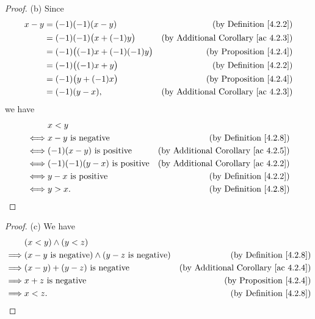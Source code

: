 \begin{proof}{(b)}
    Since
    \begin{align*}
        x - y & = (-1)(-1)(x - y)                 & \text{(by Definition \ref{4.2.2})}              \\
              & = (-1)(-1)\big(x + (-1)y\big)     & \text{(by Additional Corollary \ref{ac 4.2.3})} \\
              & = (-1)\big((-1)x + (-1)(-1)y\big) & \text{(by Proposition \ref{4.2.4})}             \\
              & = (-1)\big((-1)x + y\big)         & \text{(by Definition \ref{4.2.2})}              \\
              & = (-1)\big(y + (-1)x\big)         & \text{(by Proposition \ref{4.2.4})}             \\
              & = (-1)(y - x),                    & \text{(by Additional Corollary \ref{ac 4.2.3})}
    \end{align*}
    we have
    \begin{align*}
             & x < y                                                                                 \\
        \iff & x - y \text{ is negative}           & \text{(by Definition \ref{4.2.8})}              \\
        \iff & (-1)(x - y) \text{ is positive}     & \text{(by Additional Corollary \ref{ac 4.2.5})} \\
        \iff & (-1)(-1)(y - x) \text{ is positive} & \text{(by Additional Corollary \ref{ac 4.2.2})} \\
        \iff & y - x \text{ is positive}           & \text{(by Definition \ref{4.2.2})}              \\
        \iff & y > x.                              & \text{(by Definition \ref{4.2.8})}
    \end{align*}
\end{proof}

\begin{proof}{(c)}
    We have
    \begin{align*}
                 & (x < y) \land (y < z)                                                                                           \\
        \implies & (x - y \text{ is negative}) \land (y - z \text{ is negative}) & \text{(by Definition \ref{4.2.8})}              \\
        \implies & (x - y) + (y - z) \text{ is negative}                         & \text{(by Additional Corollary \ref{ac 4.2.4})} \\
        \implies & x + z \text{ is negative}                                     & \text{(by Proposition \ref{4.2.4})}             \\
        \implies & x < z.                                                        & \text{(by Definition \ref{4.2.8})}
    \end{align*}
\end{proof}

